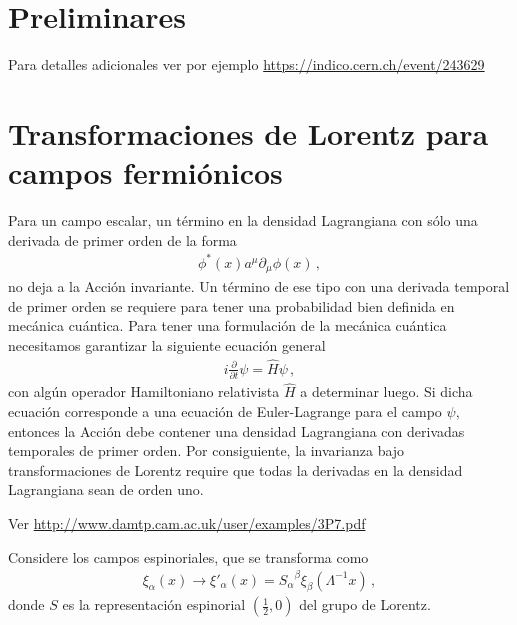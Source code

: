 \section{Preliminares}

Para detalles adicionales ver por ejemplo \url{https://indico.cern.ch/event/243629}


\section{Transformaciones de Lorentz para campos fermiónicos}
\label{sec:transf-de-lorentz-1}

Para un campo escalar, un término en la densidad Lagrangiana con sólo una derivada de primer orden de la forma
\begin{align}
\label{eq:nolor}
  \phi^*(x)a^\mu\partial_\mu\phi(x)\,,
\end{align}
no deja a la Acción invariante. Un término de ese tipo con una derivada temporal de primer orden se requiere para tener una probabilidad bien definida en mecánica cuántica.
Para tener una formulación de la mecánica cuántica necesitamos garantizar la siguiente ecuación general
\begin{align}
  i\frac{\partial}{\partial t}\psi=\hat{H} \psi\,,  
\end{align}
con algún operador Hamiltoniano relativista  $\widehat{H}$ a determinar luego. Si dicha ecuación corresponde a una ecuación de Euler-Lagrange para el campo $\psi$,
entonces la Acción debe contener una densidad Lagrangiana con derivadas temporales de primer orden. Por consiguiente, la invarianza bajo transformaciones de Lorentz require que todas la derivadas en la densidad Lagrangiana sean de orden uno.

Ver \url{http://www.damtp.cam.ac.uk/user/examples/3P7.pdf}

\begin{frame}
Considere los campos espinoriales, que se transforma como
\begin{align}
\label{eq:184qft}
  \xi_\alpha(x)\to\xi'_\alpha(x)={S_\alpha}^\beta\xi_\beta(\Lambda^{-1}x)\,, 
\end{align}
donde $S$ es la representación espinorial $(\frac{1}{2},0)$ del grupo de Lorentz. 
\end{frame}

